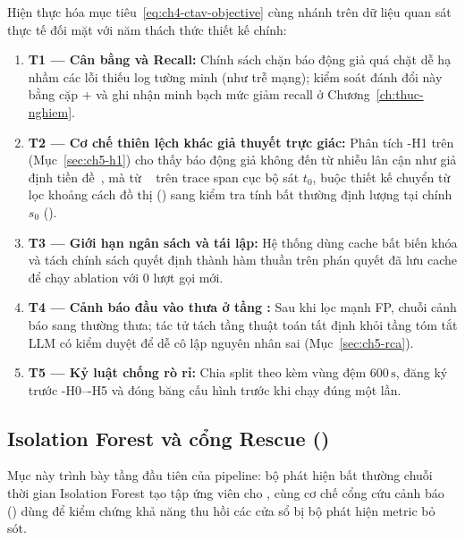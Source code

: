 Hiện thực hóa mục tiêu~\eqref{eq:ch4-ctav-objective} cùng nhánh  trên dữ liệu quan sát thực tế đối mặt với năm thách thức thiết kế chính:
\begin{enumerate}
  \item \textbf{T1 — Cân bằng  và Recall:} Chính sách chặn báo động giả quá chặt dễ hạ nhầm các lỗi thiếu log tường minh (như trễ mạng); \CTAV{} kiểm soát đánh đổi này bằng cặp  +  và ghi nhận minh bạch mức giảm recall ở Chương~\ref{ch:thuc-nghiem}.
  \item \textbf{T2 — Cơ chế thiên lệch khác giả thuyết trực giác:} Phân tích \hyp{H1} trên  (Mục~\ref{sec:ch5-h1}) cho thấy báo động giả không đến từ nhiễu lân cận như giả định tiền đề~\cite{icaetm2026}, mà từ ~\cite{sharma2024sycophancy} trên trace span cục bộ sát $t_0$, buộc thiết kế chuyển từ lọc khoảng cách đồ thị () sang kiểm tra tính bất thường định lượng tại chính $s_0$ ().
  \item \textbf{T3 — Giới hạn ngân sách và tái lập:} Hệ thống dùng cache bất biến khóa  và tách chính sách quyết định thành hàm thuần trên phán quyết đã lưu cache để chạy ablation với $0$ lượt gọi mới.
  \item \textbf{T4 — Cảnh báo đầu vào thưa ở tầng :} Sau khi \CTAV{} lọc mạnh FP, chuỗi cảnh báo sang  thường thưa; tác tử  tách tầng thuật toán tất định khỏi tầng tóm tắt LLM có kiểm duyệt để dễ cô lập nguyên nhân sai (Mục~\ref{sec:ch5-rca}).
  \item \textbf{T5 — Kỷ luật chống rò rỉ:} Chia split theo  kèm vùng đệm $600\,\text{s}$, đăng ký trước \hyp{H0}--\hyp{H5} và đóng băng cấu hình trước khi chạy  đúng một lần.
\end{enumerate}

\subsection{Isolation Forest và cổng Rescue ()}
\label{sec:ch4-detector}

Mục này trình bày tầng đầu tiên của pipeline: bộ phát hiện bất thường chuỗi thời gian Isolation Forest tạo tập ứng viên cho \CTAV{}, cùng cơ chế cổng cứu cảnh báo  () dùng để kiểm chứng khả năng thu hồi các cửa sổ bị bộ phát hiện metric bỏ sót.

